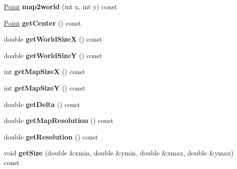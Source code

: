 \begin{DoxyCompactItemize}
\item 
\mbox{\label{classGMapping_1_1Map_a687b05f408e176b12a032835ca61b3dd}} 
\hyperlink{structGMapping_1_1point}{Point} {\bfseries map2world} (int x, int y) const
\item 
\mbox{\label{classGMapping_1_1Map_a51d79d775e7e9ba9fad119f3fe8363e0}} 
\hyperlink{structGMapping_1_1point}{Point} {\bfseries get\+Center} () const
\item 
\mbox{\label{classGMapping_1_1Map_a547de649b4e93ff35a46993bc15950fe}} 
double {\bfseries get\+World\+SizeX} () const
\item 
\mbox{\label{classGMapping_1_1Map_abfd0ba43b75538269787abbf9717b1f7}} 
double {\bfseries get\+World\+SizeY} () const
\item 
\mbox{\label{classGMapping_1_1Map_ac3ae4095e469da549d41c5f71cd4581f}} 
int {\bfseries get\+Map\+SizeX} () const
\item 
\mbox{\label{classGMapping_1_1Map_a010cbdc6712b21c9d7ae845aac10ed33}} 
int {\bfseries get\+Map\+SizeY} () const
\item 
\mbox{\label{classGMapping_1_1Map_a7e4d075ffd05e958655bd57f468dbe46}} 
double {\bfseries get\+Delta} () const
\item 
\mbox{\label{classGMapping_1_1Map_aca1bfd698a956de8d255c6d61b41bf58}} 
double {\bfseries get\+Map\+Resolution} () const
\item 
\mbox{\label{classGMapping_1_1Map_ae627deaed285f19a7d587adffb9466df}} 
double {\bfseries get\+Resolution} () const
\item 
\mbox{\label{classGMapping_1_1Map_a56be1afc747f98139c7e609d55782679}} 
void {\bfseries get\+Size} (double \&xmin, double \&ymin, double \&xmax, double \&ymax) const
\item 
\mbox{\label{classGMapping_1_1Map_a96d0d851ca48c18961ae8603b7e892ea}} 

\end{DoxyCompactItemize}
